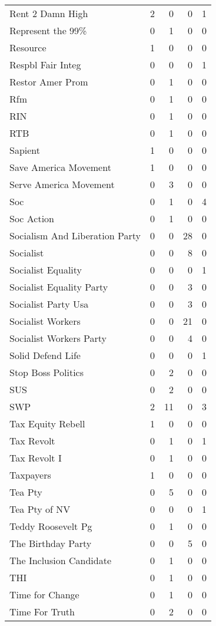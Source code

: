 \begin{supertabular}{lrrrr}
Rent 2 Damn High & 2 & 0 & 0 & 1\\
Represent the 99\% & 0 & 1 & 0 & 0\\
Resource & 1 & 0 & 0 & 0\\
Respbl Fair Integ & 0 & 0 & 0 & 1\\
Restor Amer Prom & 0 & 1 & 0 & 0\\
Rfm & 0 & 1 & 0 & 0\\
RIN & 0 & 1 & 0 & 0\\
RTB & 0 & 1 & 0 & 0\\
Sapient & 1 & 0 & 0 & 0\\
Save America Movement & 1 & 0 & 0 & 0\\
Serve America Movement & 0 & 3 & 0 & 0\\
Soc & 0 & 1 & 0 & 4\\
Soc Action & 0 & 1 & 0 & 0\\
Socialism And Liberation Party & 0 & 0 & 28 & 0\\
Socialist & 0 & 0 & 8 & 0\\
Socialist Equality & 0 & 0 & 0 & 1\\
Socialist Equality Party & 0 & 0 & 3 & 0\\
Socialist Party Usa & 0 & 0 & 3 & 0\\
Socialist Workers & 0 & 0 & 21 & 0\\
Socialist Workers Party & 0 & 0 & 4 & 0\\
Solid Defend Life & 0 & 0 & 0 & 1\\
Stop Boss Politics & 0 & 2 & 0 & 0\\
SUS & 0 & 2 & 0 & 0\\
SWP & 2 & 11 & 0 & 3\\
Tax Equity Rebell & 1 & 0 & 0 & 0\\
Tax Revolt & 0 & 1 & 0 & 1\\
Tax Revolt I & 0 & 1 & 0 & 0\\
Taxpayers & 1 & 0 & 0 & 0\\
Tea Pty & 0 & 5 & 0 & 0\\
Tea Pty of NV & 0 & 0 & 0 & 1\\
Teddy Roosevelt Pg & 0 & 1 & 0 & 0\\
The Birthday Party & 0 & 0 & 5 & 0\\
The Inclusion Candidate & 0 & 1 & 0 & 0\\
THI & 0 & 1 & 0 & 0\\
Time for Change & 0 & 1 & 0 & 0\\
Time For Truth & 0 & 2 & 0 & 0\\

\end{supertabular}
